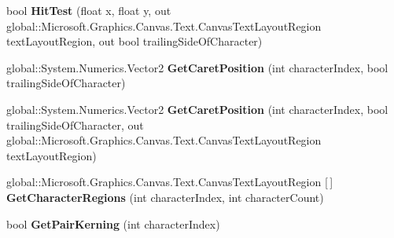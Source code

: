 \begin{DoxyCompactItemize}
\item 
\mbox{\label{interface_microsoft_1_1_graphics_1_1_canvas_1_1_text_1_1_i_canvas_text_layout_a457ec60b8296c34aec79cbe740e5f6b3}} 
bool {\bfseries Hit\+Test} (float x, float y, out global\+::\+Microsoft.\+Graphics.\+Canvas.\+Text.\+Canvas\+Text\+Layout\+Region text\+Layout\+Region, out bool trailing\+Side\+Of\+Character)
\item 
\mbox{\label{interface_microsoft_1_1_graphics_1_1_canvas_1_1_text_1_1_i_canvas_text_layout_a1ed232fe08a85f9c93273ae59226368a}} 
global\+::\+System.\+Numerics.\+Vector2 {\bfseries Get\+Caret\+Position} (int character\+Index, bool trailing\+Side\+Of\+Character)
\item 
\mbox{\label{interface_microsoft_1_1_graphics_1_1_canvas_1_1_text_1_1_i_canvas_text_layout_a5f70488facfba5d5a53175e0fbdb74e0}} 
global\+::\+System.\+Numerics.\+Vector2 {\bfseries Get\+Caret\+Position} (int character\+Index, bool trailing\+Side\+Of\+Character, out global\+::\+Microsoft.\+Graphics.\+Canvas.\+Text.\+Canvas\+Text\+Layout\+Region text\+Layout\+Region)
\item 
\mbox{\label{interface_microsoft_1_1_graphics_1_1_canvas_1_1_text_1_1_i_canvas_text_layout_a9ce2304a76b40116670a355bc5982d5b}} 
global\+::\+Microsoft.\+Graphics.\+Canvas.\+Text.\+Canvas\+Text\+Layout\+Region \mbox{[}$\,$\mbox{]} {\bfseries Get\+Character\+Regions} (int character\+Index, int character\+Count)
\item 
\mbox{\label{interface_microsoft_1_1_graphics_1_1_canvas_1_1_text_1_1_i_canvas_text_layout_aad1825e0663c1f7846a93a175cf888e5}} 
bool {\bfseries Get\+Pair\+Kerning} (int character\+Index)
\item 
\mbox{\label{interface_microsoft_1_1_graphics_1_1_canvas_1_1_text_1_1_i_canvas_text_layout_a20aaafcf4e028122cfc8726b8fbc1f5b}} 

\end{DoxyCompactItemize}
